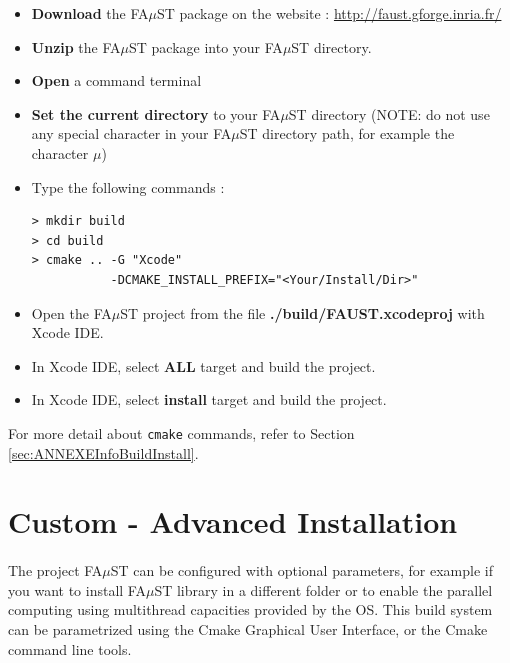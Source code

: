 \begin{itemize}
\item \textbf{Download} the FA$\mu$ST package on the website :  \url{http://faust.gforge.inria.fr/}
\item \textbf{Unzip} the FA$\mu$ST package into your FA$\mu$ST directory.
\item \textbf{Open} a command terminal
\item \textbf{Set the current directory} to your FA$\mu$ST directory (NOTE: do not use any special character in your FA$\mu$ST directory path, for example the character $\mu$)
\item Type the following commands : 
\begin{lstlisting}
> mkdir build
> cd build
> cmake .. -G "Xcode" 
		   -DCMAKE_INSTALL_PREFIX="<Your/Install/Dir>"
\end{lstlisting}

\item Open the FA$\mu$ST project from the file \textbf{./build/FAUST.xcodeproj} with Xcode IDE. 
\item In Xcode IDE, select \textbf{ALL} target and build the project. 
\item In Xcode IDE, select \textbf{install} target and build the project. 
\end{itemize}

For more detail about \texttt{cmake} commands, refer to Section \ref{sec:ANNEXEInfoBuildInstall}.



\section{Custom - Advanced Installation}\label{sec:UnixCustomInstall}

\paragraph{}The project FA$\mu$ST can be configured with optional parameters, for example if you want to install FA$\mu$ST library in a different folder or to enable the parallel computing using multithread capacities provided by the OS. This build system can be parametrized using the Cmake Graphical User Interface, or the Cmake command line tools. 

